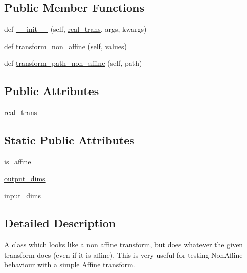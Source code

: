 \subsection*{Public Member Functions}
\begin{DoxyCompactItemize}
\item 
def \hyperlink{classmatplotlib_1_1tests_1_1test__transforms_1_1NonAffineForTest_a7e360cd8aa68e740558226885f4763b4}{\+\_\+\+\_\+init\+\_\+\+\_\+} (self, \hyperlink{classmatplotlib_1_1tests_1_1test__transforms_1_1NonAffineForTest_a1e2ca19045399988c2bfa644ff877dc6}{real\+\_\+trans}, args, kwargs)
\item 
def \hyperlink{classmatplotlib_1_1tests_1_1test__transforms_1_1NonAffineForTest_ad559d4ca2b9ba299359ce5e45e166542}{transform\+\_\+non\+\_\+affine} (self, values)
\item 
def \hyperlink{classmatplotlib_1_1tests_1_1test__transforms_1_1NonAffineForTest_a91d4aea1f9780c79bc4c3075638ee32d}{transform\+\_\+path\+\_\+non\+\_\+affine} (self, path)
\end{DoxyCompactItemize}
\subsection*{Public Attributes}
\begin{DoxyCompactItemize}
\item 
\hyperlink{classmatplotlib_1_1tests_1_1test__transforms_1_1NonAffineForTest_a1e2ca19045399988c2bfa644ff877dc6}{real\+\_\+trans}
\end{DoxyCompactItemize}
\subsection*{Static Public Attributes}
\begin{DoxyCompactItemize}
\item 
\hyperlink{classmatplotlib_1_1tests_1_1test__transforms_1_1NonAffineForTest_a6457cb50dae606b3c1b52523c6e1ad19}{is\+\_\+affine}
\item 
\hyperlink{classmatplotlib_1_1tests_1_1test__transforms_1_1NonAffineForTest_adc940195d987dfa2a37794fcc578c8c4}{output\+\_\+dims}
\item 
\hyperlink{classmatplotlib_1_1tests_1_1test__transforms_1_1NonAffineForTest_a5e54f3f6070ede5128b5685a97dd9c7f}{input\+\_\+dims}
\end{DoxyCompactItemize}


\subsection{Detailed Description}
\begin{DoxyVerb}A class which looks like a non affine transform, but does whatever
the given transform does (even if it is affine). This is very useful
for testing NonAffine behaviour with a simple Affine transform.\end{DoxyVerb}
 

